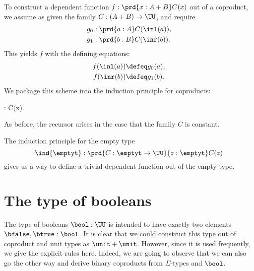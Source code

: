 To construct a dependent function $f:\prd{x:A+B}C(x)$ out of a coproduct, we assume as given the family 
$C: (A + B) \to \UU$, and 
require 
\begin{align*}
  g_0 &: \prd{a:A} C(\inl(a)), \\
  g_1 &: \prd{b:B} C(\inr(b)).
\end{align*}
This yields $f$ with the defining equations:
\begin{align*}
  f(\inl(a)) &\defeq g_0(a), \\
  f(\inr(b)) &\defeq g_1(b).
\end{align*}
We package this scheme into the induction principle for coproducts:
%
\begin{narrowmultline*}
   :
   \to \narrowbreak
   \to {}C(x). 
\end{narrowmultline*}
As before, the recursor arises in the case that the family $C$ is
constant. 

The induction principle for the empty type
%
\[ \ind{\emptyt} : \prd{C:\emptyt \to \UU}{z:\emptyt} C(z) \]
gives us a way to define a trivial dependent function out of the
empty type. %

%
%


\section{The type of booleans}
\label{sec:type-booleans}

%
%
The type of booleans $\bool:\UU$ is intended to have exactly two elements 
$\bfalse,\btrue : \bool$. It is clear that we could construct this
type out of coproduct
%
and unit types as $\unit + \unit$. However,
since it is used frequently, we give the explicit rules here.
Indeed, we are going to observe that we can also go the other way
and derive binary coproducts from $\Sigma$-types and $\bool$.

